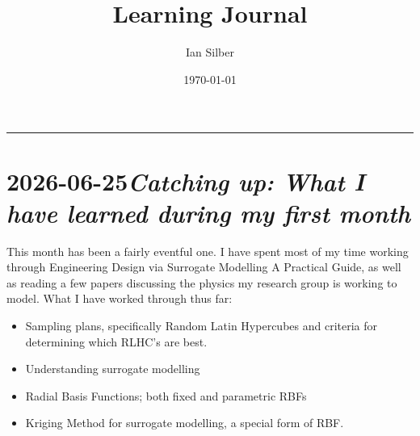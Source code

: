 \documentclass[11pt]{article}
\title{Learning Journal}
\author{Ian Silber}                      %
\date{\today}                  %
\newcommand{\entry}[2]{\clearpage\section[#2]{#1\quad\textnormal{\textit{#2}}}}
\theoremstyle{definition}
\begin{document}
\maketitle
\tableofcontents               %
\vspace{1em}\hrule\vspace{1em}

\entry{2026-06-25}{Catching up: What I have learned during my first month}

This month has been a fairly eventful one. 
I have spent most of my time working through Engineering Design via Surrogate Modelling A Practical Guide, 
as well as reading a few papers discussing the physics my research group is working to model.
\newline
What I have worked through thus far:
\begin{itemize}
  \item Sampling plans, specifically Random Latin Hypercubes and criteria for determining which RLHC's are best.
  \item Understanding surrogate modelling
  \item Radial Basis Functions; both fixed and parametric RBFs
  \item Kriging Method for surrogate modelling, a special form of RBF.
\end{itemize}
\end{document}
